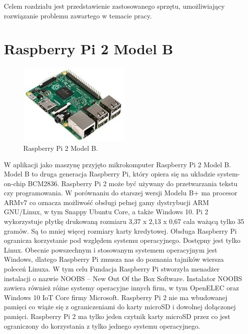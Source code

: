 Celem rozdziału jest przedstawienie zastosowanego sprzętu, umożliwiający rozwiązanie problemu zawartego w temacie pracy.
\section{Raspberry Pi 2 Model B} 
\begin{figure}[htbp]
	\centering
	\includegraphics[width=0.7\linewidth]{"obrazy/Raspberry Pi"}
	\caption{Raspberry Pi 2 Model B.}
	\label{fig:1}
\end{figure}
W aplikacji jako maszynę przyjęto mikrokomputer Raspberry Pi 2 Model B. Model B to druga generacja Raspberry Pi, który opiera się na układzie system-on-chip BCM2836. Raspberry Pi 2 może być używany do przetwarzania tekstu czy programowania. W porównaniu do starszej wersji Modelu B+ ma procesor ARMv7 co oznacza możliwość obsługi pełnej gamy dystrybucji ARM GNU/Linux,  w tym Snappy Ubuntu Core, a także Windows 10. Pi 2 wykorzystuje płytkę drukowaną rozmiaru 3,37 x 2,13 x 0,67 cala ważącą tylko 35 gramów. Są to mniej więcej rozmiary karty kredytowej.
Obsługa Raspberry Pi ogranicza korzystanie pod względem systemu operacyjnego. Dostępny jest tylko Linux. Obecnie powszechnym i stosowanym systemem operacyjnym jest Windows, dlatego Raspberry Pi zmusza nas do poznania tajników wiersza poleceń Linuxa. W tym celu Fundacja Raspberry Pi stworzyła menadżer instalacji o nazwie NOOBS – New Out Of the Box Software. Instalator NOOBS zawiera również różne systemy operacyjne innych firm, w tym OpenELEC oraz Windows 10 IoT Core firmy Microsoft. Raspberry Pi 2 nie ma wbudowanej pamięci co wiąże się z ograniczeniami do karty microSD i dowolnej dołączonej pamięci. Raspberry Pi 2 ma tylko jeden czytnik karty microSD przez co jest ograniczony do korzystania z tylko jednego systemu operacyjnego.

